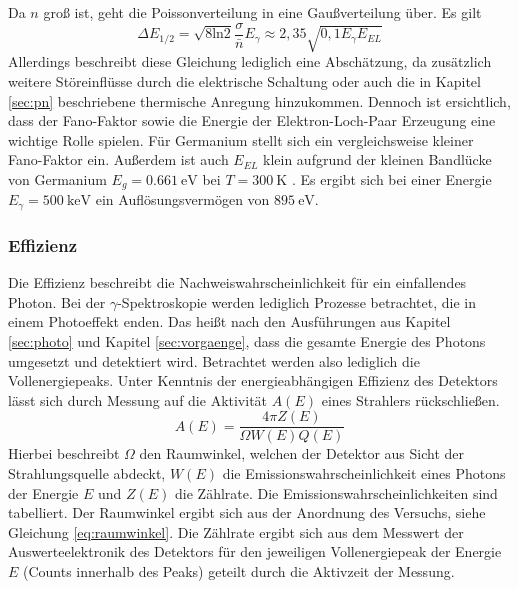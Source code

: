 Da $n$ groß ist, geht die Poissonverteilung in eine Gaußverteilung über. Es gilt
\begin{equation}
  \Delta E_{1/2} = \sqrt{8\text{ln}2} \frac{\sigma}{\bar{n}}E_\gamma \approx 2,35 \sqrt{0,1 E_\gamma E_{EL}}
  \label{eq:deltae}
\end{equation}
Allerdings beschreibt diese Gleichung lediglich eine Abschätzung, da zusätzlich weitere Störeinflüsse durch die elektrische Schaltung oder auch die in Kapitel \ref{sec:pn} beschriebene thermische Anregung hinzukommen. Dennoch ist ersichtlich, dass der Fano-Faktor sowie die Energie der Elektron-Loch-Paar Erzeugung eine wichtige Rolle spielen. Für Germanium stellt sich ein vergleichsweise kleiner Fano-Faktor ein. Außerdem ist auch $E_{EL}$ klein aufgrund der kleinen Bandlücke von Germanium $E_g = \SI{0,661}{\electronvolt}$ bei $T=\SI{300}{\kelvin}$ \cite{Egap}. Es ergibt sich bei einer Energie $E_\gamma = \SI{500}{\kilo\electronvolt}$ ein Auflösungsvermögen von $\SI{895}{\electronvolt}$.

\subsubsection{Effizienz}
\label{sec:effizienz}
Die Effizienz beschreibt die Nachweiswahrscheinlichkeit für ein einfallendes Photon. Bei der $\gamma$-Spektroskopie werden lediglich Prozesse betrachtet, die in einem Photoeffekt enden. Das heißt nach den Ausführungen aus Kapitel \ref{sec:photo} und Kapitel \ref{sec:vorgaenge}, dass die gesamte Energie des Photons umgesetzt und detektiert wird. Betrachtet werden also lediglich die Vollenergiepeaks. Unter Kenntnis der energieabhängigen Effizienz des Detektors lässt sich durch Messung auf die Aktivität $A(E)$ eines Strahlers rückschließen.
\begin{equation}
  A(E) = \frac{4\pi Z(E)}{\Omega W(E) Q(E)}
  \label{eq:effizienz}
\end{equation}
Hierbei beschreibt $\Omega$ den Raumwinkel, welchen der Detektor aus Sicht der Strahlungsquelle abdeckt, $W(E)$ die Emissionswahrscheinlichkeit eines Photons der Energie $E$ und $Z(E)$ die Zählrate. Die Emissionswahrscheinlichkeiten sind tabelliert. Der Raumwinkel ergibt sich aus der Anordnung des Versuchs, siehe Gleichung \eqref{eq:raumwinkel}. Die Zählrate ergibt sich aus dem Messwert der Auswerteelektronik des Detektors für den jeweiligen Vollenergiepeak der Energie $E$ (Counts innerhalb des Peaks) geteilt durch die Aktivzeit der Messung.
